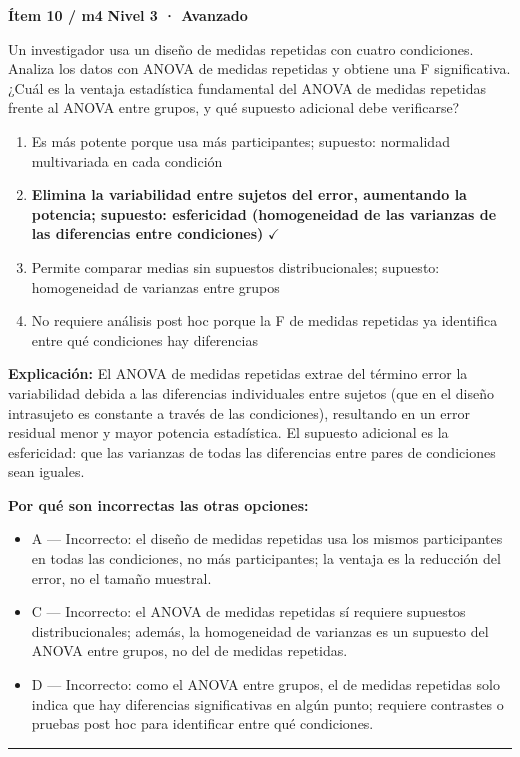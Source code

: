 \documentclass[12pt,a4paper]{article}
\begin{document}
\begin{mdframed}[backgroundcolor=fondogris,linecolor=rojo,linewidth=1pt,innerleftmargin=10pt,innerrightmargin=10pt,innertopmargin=7pt,innerbottommargin=7pt]
\textbf{Ítem 10 / m4} \hfill {\small\bfseries\color{rojo} Nivel 3 · Avanzado}
\end{mdframed}

Un investigador usa un diseño de medidas repetidas con cuatro condiciones. Analiza los datos con ANOVA de medidas repetidas y obtiene una F significativa. ¿Cuál es la ventaja estadística fundamental del ANOVA de medidas repetidas frente al ANOVA entre grupos, y qué supuesto adicional debe verificarse?

\begin{enumerate}
  \item[A.] Es más potente porque usa más participantes; supuesto: normalidad multivariada en cada condición
  \item[\textbf{\color{verde}B.}] \textbf{\color{verde} Elimina la variabilidad entre sujetos del error, aumentando la potencia; supuesto: esfericidad (homogeneidad de las varianzas de las diferencias entre condiciones)} \hfill $\checkmark$
  \item[C.] Permite comparar medias sin supuestos distribucionales; supuesto: homogeneidad de varianzas entre grupos
  \item[D.] No requiere análisis post hoc porque la F de medidas repetidas ya identifica entre qué condiciones hay diferencias
\end{enumerate}

\noindent\textbf{\color{azul}Explicación:} El ANOVA de medidas repetidas extrae del término error la variabilidad debida a las diferencias individuales entre sujetos (que en el diseño intrasujeto es constante a través de las condiciones), resultando en un error residual menor y mayor potencia estadística. El supuesto adicional es la esfericidad: que las varianzas de todas las diferencias entre pares de condiciones sean iguales.

\noindent\textbf{\color{gris}Por qué son incorrectas las otras opciones:}
\begin{itemize}
  \item {\small A — Incorrecto: el diseño de medidas repetidas usa los mismos participantes en todas las condiciones, no más participantes; la ventaja es la reducción del error, no el tamaño muestral.}
  \item {\small C — Incorrecto: el ANOVA de medidas repetidas sí requiere supuestos distribucionales; además, la homogeneidad de varianzas es un supuesto del ANOVA entre grupos, no del de medidas repetidas.}
  \item {\small D — Incorrecto: como el ANOVA entre grupos, el de medidas repetidas solo indica que hay diferencias significativas en algún punto; requiere contrastes o pruebas post hoc para identificar entre qué condiciones.}
\end{itemize}
\vspace{8pt}\hrule\vspace{10pt}
\end{document}
